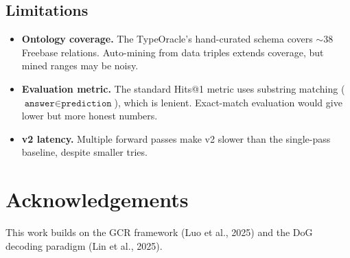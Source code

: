 \documentclass[11pt,a4paper]{article}
\begin{document}
\subsection{Limitations}

\begin{itemize}
  \item \textbf{Ontology coverage.}  The TypeOracle's hand-curated
    schema covers $\sim$38 Freebase relations.  Auto-mining from data
    triples extends coverage, but mined ranges may be noisy.
  \item \textbf{Evaluation metric.}  The standard Hits@1 metric uses
    substring matching ($\texttt{answer} \in \texttt{prediction}$),
    which is lenient.  Exact-match evaluation would give lower but more
    honest numbers.
  \item \textbf{v2 latency.}  Multiple forward passes make v2 slower
    than the single-pass baseline, despite smaller tries.
\end{itemize}

\section*{Acknowledgements}

This work builds on the GCR framework (Luo et al., 2025) and the DoG
decoding paradigm (Lin et al., 2025).
\end{document}
